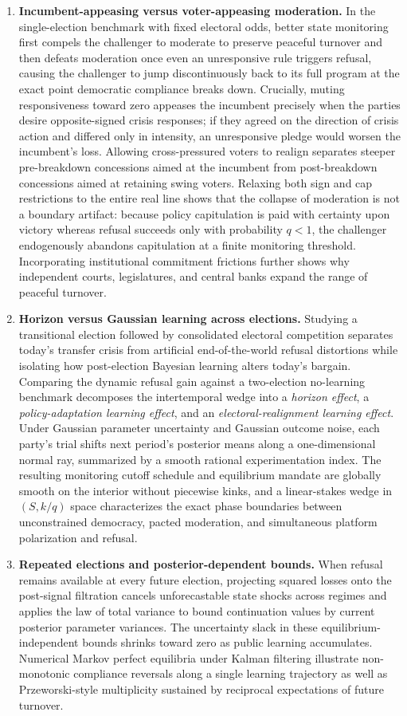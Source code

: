 \documentclass[11pt,letterpaper]{article}
\begin{document}
\begin{enumerate}
\item \textbf{Incumbent-appeasing versus voter-appeasing moderation.} In the single-election benchmark with fixed electoral odds, better state monitoring first compels the challenger to moderate to preserve peaceful turnover and then defeats moderation once even an unresponsive rule triggers refusal, causing the challenger to jump discontinuously back to its full program at the exact point democratic compliance breaks down. Crucially, muting responsiveness toward zero appeases the incumbent precisely when the parties desire opposite-signed crisis responses; if they agreed on the direction of crisis action and differed only in intensity, an unresponsive pledge would worsen the incumbent's loss. Allowing cross-pressured voters to realign separates steeper pre-breakdown concessions aimed at the incumbent from post-breakdown concessions aimed at retaining swing voters. Relaxing both sign and cap restrictions to the entire real line shows that the collapse of moderation is not a boundary artifact: because policy capitulation is paid with certainty upon victory whereas refusal succeeds only with probability $q<1$, the challenger endogenously abandons capitulation at a finite monitoring threshold. Incorporating institutional commitment frictions further shows why independent courts, legislatures, and central banks expand the range of peaceful turnover.
\item \textbf{Horizon versus Gaussian learning across elections.} Studying a transitional election followed by consolidated electoral competition separates today's transfer crisis from artificial end-of-the-world refusal distortions while isolating how post-election Bayesian learning alters today's bargain. Comparing the dynamic refusal gain against a two-election no-learning benchmark decomposes the intertemporal wedge into a \emph{horizon effect}, a \emph{policy-adaptation learning effect}, and an \emph{electoral-realignment learning effect}. Under Gaussian parameter uncertainty and Gaussian outcome noise, each party's trial shifts next period's posterior means along a one-dimensional normal ray, summarized by a smooth rational experimentation index. The resulting monitoring cutoff schedule and equilibrium mandate are globally smooth on the interior without piecewise kinks, and a linear-stakes wedge in $(S,k/q)$ space characterizes the exact phase boundaries between unconstrained democracy, pacted moderation, and simultaneous platform polarization and refusal.
\item \textbf{Repeated elections and posterior-dependent bounds.} When refusal remains available at every future election, projecting squared losses onto the post-signal filtration cancels unforecastable state shocks across regimes and applies the law of total variance to bound continuation values by current posterior parameter variances. The uncertainty slack in these equilibrium-independent bounds shrinks toward zero as public learning accumulates. Numerical Markov perfect equilibria under Kalman filtering illustrate non-monotonic compliance reversals along a single learning trajectory as well as Przeworski-style multiplicity sustained by reciprocal expectations of future turnover.

\end{enumerate}
\end{document}
